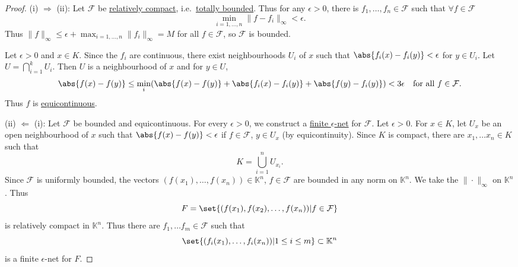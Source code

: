 \documentclass{article}
\newcommand{\K}{\mathbb{K}}
\begin{document}
\begin{proof}
    (i) $\Rightarrow$ (ii):
    Let $\mathcal{F}$ be \hyperlink{def:relCompact}{relatively compact}, i.e.\ \hyperlink{def:totBound}{totally bounded}.
    Thus for any $\epsilon > 0$, there is $f_1, \dotsc, f_n \in \mathcal{F}$ such that $\forall f \in \mathcal{F}$
    \begin{equation*}
        \min_{i=1, \dotsc, n} \|f - f_i\|_\infty < \epsilon.
    \end{equation*}
    Thus $\|f\|_\infty \leq \epsilon + \max_{i = 1, \dotsc, n} \|f_i\|_\infty = M$ for all $f \in \mathcal{F}$, so $\mathcal{F}$ is bounded.

    Let $\epsilon > 0$ and $x \in K$.
    Since the $f_i$ are continuous, there exist neighbourhoods $U_i$ of $x$ such that $\abs{f_i(x) - f_i(y)} < \epsilon$ for $y \in U_i$.
    Let $U = \bigcap_{i=1}^k U_i$. Then $U$ is a neighbourhood of $x$ and for $y \in U$,
    \begin{equation*}
        \abs{f(x) - f(y)} \leq \min_i(\abs{f(x) - f(y)} + \abs{f_i(x) - f_i(y)} + \abs{f(y) - f_i(y)}) < 3\epsilon \quad \text{for all } f \in \mathcal{F}.
    \end{equation*}
    Thus $f$ is \hyperlink{def:equicontinuous}{equicontinuous}.

    (ii) $\Leftarrow$  (i):
    Let $\mathcal{F}$ be bounded and equicontinuous. For every $\epsilon > 0$, we construct a \hyperlink{def:enet}{finite $\epsilon$-net} for $\mathcal{F}$. Let $\epsilon > 0$.
    For $x \in K$, let $U_x$ be an open neighbourhood of $x$ such that $\abs{f(x) - f(y)} < \epsilon$ if $f \in \mathcal{F}$, $y \in U_x$ (by equicontinuity).
    Since $K$ is compact, there are $x_1, \dotsc x_n \in K$ such that
    \begin{equation*}
        K = \bigcup_{i=1}^n U_{x_i}.
    \end{equation*}
    Since $\mathcal{F}$ is uniformly bounded, the vectors $(f(x_1), \dotsc, f(x_n)) \in \K^n$, $f \in \mathcal{F}$ are bounded in any norm on $\K^n$. We take the $\|\cdot\|_\infty$ on $\K^n$. Thus
    \begin{equation*}
        F = \set{(f(x_1), f(x_2), \dotsc, f(x_n)) | f \in \mathcal{F}}
    \end{equation*}
    is relatively compact in $\K^n$.
    Thus there are $f_1, \dotsc f_m \in \mathcal{F}$ such that
    \begin{equation*}
        \set{(f_i(x_1), \dotsc, f_i(x_n)) | 1 \leq i \leq m} \subset \K^n
    \end{equation*}
    is a finite $\epsilon$-net for $F$.


\end{proof}
\end{document}
